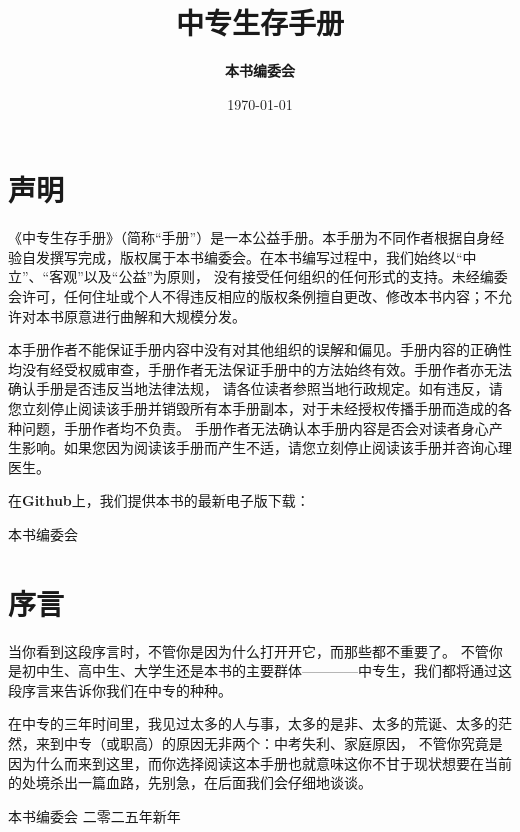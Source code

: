 \documentclass{article}
\begin{document}
\title{\textbf{中专生存手册}}
\author{\textbf{本书编委会}}
\date{\today{}}

\maketitle
\thispagestyle{empty}
\newpage

\section{声明}

《中专生存手册》（简称“手册”）是一本公益手册。本手册为不同作者根据自身经验自发撰写完成，版权属于本书编委会。在本书编写过程中，我们始终以“中立”、“客观”以及“公益”为原则，
没有接受任何组织的任何形式的支持。未经编委会许可，任何住址或个人不得违反相应的版权条例擅自更改、修改本书内容；不允许对本书原意进行曲解和大规模分发。

本手册作者不能保证手册内容中没有对其他组织的误解和偏见。手册内容的正确性均没有经受权威审查，手册作者无法保证手册中的方法始终有效。手册作者亦无法确认手册是否违反当地法律法规，
请各位读者参照当地行政规定。如有违反，请您立刻停止阅读该手册并销毁所有本手册副本，对于未经授权传播手册而造成的各种问题，手册作者均不负责。
手册作者无法确认本手册内容是否会对读者身心产生影响。如果您因为阅读该手册而产生不适，请您立刻停止阅读该手册并咨询心理医生。

在\textbf{Github}上，我们提供本书的最新电子版下载：

\begin{flushright}
本书编委会
\end{flushright}
\newpage

\section{序言}

当你看到这段序言时，不管你是因为什么打开开它，而那些都不重要了。
不管你是初中生、高中生、大学生还是本书的主要群体————中专生，我们都将通过这段序言来告诉你我们在中专的种种。

在中专的三年时间里，我见过太多的人与事，太多的是非、太多的荒诞、太多的茫然，来到中专（或职高）的原因无非两个：中考失利、家庭原因，
不管你究竟是因为什么而来到这里，而你选择阅读这本手册也就意味这你不甘于现状想要在当前的处境杀出一篇血路，先别急，在后面我们会仔细地谈谈。

\begin{flushright}
本书编委会 \newline
二零二五年新年
\end{flushright}

\newpage
\tableofcontents



\end{document}
